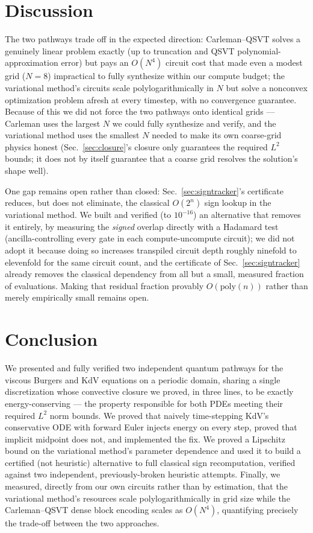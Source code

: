 \documentclass[aps,pra,twocolumn,notitlepage,superscriptaddress,floatfix,10pt]{revtex4-2}
\begin{document}
\section{Discussion}
\label{sec:discussion}

The two pathways trade off in the expected direction: Carleman--QSVT solves a genuinely linear
problem exactly (up to truncation and QSVT polynomial-approximation error) but pays an $O(N^4)$
circuit cost that made even a modest grid ($N=8$) impractical to fully synthesize within our
compute budget; the variational method's circuits scale polylogarithmically in $N$ but solve a
nonconvex optimization problem afresh at every timestep, with no convergence guarantee. Because of
this we did not force the two pathways onto identical grids --- Carleman uses the largest $N$ we
could fully synthesize and verify, and the variational method uses the smallest $N$ needed to make
its own coarse-grid physics honest (Sec.~\ref{sec:closure}'s closure only guarantees the required
$L^2$ bounds; it does not by itself guarantee that a coarse grid resolves the solution's shape well).

One gap remains open rather than closed: Sec.~\ref{sec:signtracker}'s certificate reduces, but does
not eliminate, the classical $O(2^n)$ sign lookup in the variational method. We built and verified
(to $10^{-16}$) an alternative that removes it entirely, by measuring the \emph{signed} overlap
directly with a Hadamard test (ancilla-controlling every gate in each compute-uncompute circuit); we
did not adopt it because doing so increases transpiled circuit depth roughly ninefold to elevenfold
for the same circuit count, and the certificate of Sec.~\ref{sec:signtracker} already removes the
classical dependency from all but a small, measured fraction of evaluations. Making that residual
fraction provably $O(\mathrm{poly}(n))$ rather than merely empirically small remains open.

\section{Conclusion}

We presented and fully verified two independent quantum pathways for the viscous Burgers and KdV
equations on a periodic domain, sharing a single discretization whose convective closure we proved,
in three lines, to be exactly energy-conserving --- the property responsible for both PDEs meeting
their required $L^2$ norm bounds. We proved that naively time-stepping KdV's conservative ODE with
forward Euler injects energy on every step, proved that implicit midpoint does not, and implemented
the fix. We proved a Lipschitz bound on the variational method's parameter dependence and used it to
build a certified (not heuristic) alternative to full classical sign recomputation, verified against
two independent, previously-broken heuristic attempts. Finally, we measured, directly from our own
circuits rather than by estimation, that the variational method's resources scale
polylogarithmically in grid size while the Carleman--QSVT dense block encoding scales as $O(N^4)$,
quantifying precisely the trade-off between the two approaches.
\end{document}
